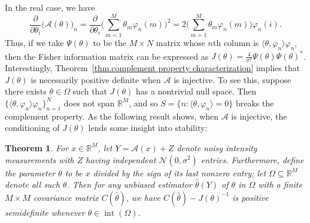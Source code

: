\documentclass[times,10pt]{elsarticle}
\theoremstyle{plain}
\newtheorem{theorem}{Theorem}
\begin{document}
In the real case, we have
\begin{equation*}
\frac{\partial}{\partial\theta_i}\big(\mathcal{A}(\theta)\big)_n
=\frac{\partial}{\partial\theta_i}\bigg(\sum_{m=1}^M\theta_m\varphi_n(m)\bigg)^2
=2\bigg(\sum_{m=1}^M\theta_m\varphi_n(m)\bigg)\varphi_n(i).
\end{equation*}
Thus, if we take $\Psi(\theta)$ to be the $M\times N$ matrix whose $n$th column is $\langle\theta,\varphi_n\rangle \varphi_n$, then the Fisher information matrix can be expressed as $J(\theta)=\frac{4}{\sigma^2}\Psi(\theta)\Psi(\theta)^*$.
Interestingly, Theorem~\ref{thm.complement property characterization} implies that $J(\theta)$ is necessarily positive definite when $\mathcal{A}$ is injective.
To see this, suppose there exists $\theta\in\Omega$ such that $J(\theta)$ has a nontrivial null space.
Then $\{\langle\theta,\varphi_n\rangle \varphi_n\}_{n=1}^N$ does not span $\mathbb{R}^M$, and so $S=\{n:\langle\theta,\varphi_n\rangle=0\}$ breaks the complement property.
As the following result shows, when $\mathcal{A}$ is injective, the conditioning of $J(\theta)$ lends some insight into stability:

\begin{theorem}
\label{thm.real random stability}
For $x\in\mathbb{R}^M$, let $Y=\mathcal{A}(x)+Z$ denote noisy intensity measurements with $Z$ having independent $\mathcal{N}(0,\sigma^2)$ entries.
Furthermore, define the parameter $\theta$ to be $x$ divided by the sign of its last nonzero entry; let $\Omega\subseteq\mathbb{R}^{M}$ denote all such $\theta$.
Then for any unbiased estimator $\hat{\theta}(Y)$ of $\theta$ in $\Omega$ with a finite $M\times M$ covariance matrix $C(\hat{\theta})$, we have $C(\hat{\theta})-J(\theta)^{-1}$ is positive semidefinite whenever $\theta\in\operatorname{int}(\Omega)$. 
\end{theorem}
\end{document}
